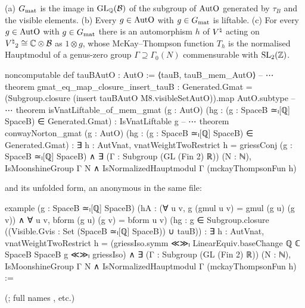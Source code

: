 \begin{theorem}\label{ch22:thm:gmat}
(a) $G_{\mathrm{mat}}$ is the image in $\mathrm{GL}_{\mathbb{Q}}(\mathcal{B})$ of the subgroup of $\mathrm{AutO}$ generated by $\tau_B$ and
the visible elements.
(b) Every $g\in\mathrm{AutO}$ with $g\in G_{\mathrm{mat}}$ is liftable.
(c) For every $g\in\mathrm{AutO}$ with $g\in G_{\mathrm{mat}}$ there is an automorphism $h$ of ${V^{\natural}}$ acting on
${V^{\natural}}_2\cong{\mathbb{C}}\otimes\mathcal{B}$ as $1\otimes g$, whose McKay--Thompson function $T_h$ is the normalised Hauptmodul of a
genus-zero group $\Gamma\supseteq\Gamma_0(N)$ commensurable with $\mathrm{SL}_2({\mathbb{Z}})$.
\end{theorem}
\begin{leancode}
noncomputable def tauBAutO : AutO := ⟨tauB, tauB_mem_AutO⟩
-- ⋯
theorem gmat_eq_map_closure_insert_tauB :
    Generated.Gmat = (Subgroup.closure (insert tauBAutO M8.visibleSetAutO)).map AutO.subtype
-- ⋯
theorem isVnatLiftable_of_mem_gmat (g : AutO)
    (hg : (g : SpaceB ≃ₗ[ℚ] SpaceB) ∈ Generated.Gmat) : IsVnatLiftable g
-- ⋯
theorem conwayNorton_gmat (g : AutO) (hg : (g : SpaceB ≃ₗ[ℚ] SpaceB) ∈ Generated.Gmat) :
    ∃ h : AutVnat, vnatWeightTwoRestrict h = griessConj (g : SpaceB ≃ₗ[ℚ] SpaceB) ∧
      ∃ (Γ : Subgroup (GL (Fin 2) ℝ)) (N : ℕ), IsMoonshineGroup Γ N ∧
        IsNormalizedHauptmodul Γ (mckayThompsonFun h)
\end{leancode}
and its unfolded form, an anonymous  in the same file:
\begin{leancode}
example (g : SpaceB ≃ₗ[ℚ] SpaceB)
    (hA : (∀ u v, g (gmul u v) = gmul (g u) (g v)) ∧ ∀ u v, bform (g u) (g v) = bform u v)
    (hg : g ∈ Subgroup.closure ((Visible.Gvis : Set (SpaceB ≃ₗ[ℚ] SpaceB)) ∪ {tauB})) :
    ∃ h : AutVnat, vnatWeightTwoRestrict h
        = (griessIso.symm ≪≫ₗ LinearEquiv.baseChange ℚ ℂ SpaceB SpaceB g ≪≫ₗ griessIso) ∧
      ∃ (Γ : Subgroup (GL (Fin 2) ℝ)) (N : ℕ), IsMoonshineGroup Γ N ∧
        IsNormalizedHauptmodul Γ (mckayThompsonFun h) :=
\end{leancode}
(; full names ,
etc.)
